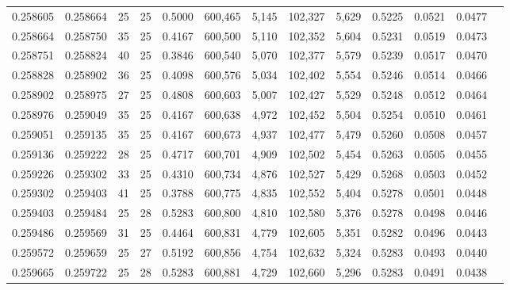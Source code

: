 \begin{tabular}{rrrrrrrrrrrrr}
0.258605 & 0.258664 &    25 &  25 &                                     0.5000 & 600,465 &   5,145 & 102,327 &   5,629 & 0.5225 & 0.0521 & 0.0477 \\
0.258664 & 0.258750 &    35 &  25 &                                     0.4167 & 600,500 &   5,110 & 102,352 &   5,604 & 0.5231 & 0.0519 & 0.0473 \\
0.258751 & 0.258824 &    40 &  25 &                                     0.3846 & 600,540 &   5,070 & 102,377 &   5,579 & 0.5239 & 0.0517 & 0.0470 \\
0.258828 & 0.258902 &    36 &  25 &                                     0.4098 & 600,576 &   5,034 & 102,402 &   5,554 & 0.5246 & 0.0514 & 0.0466 \\
0.258902 & 0.258975 &    27 &  25 &                                     0.4808 & 600,603 &   5,007 & 102,427 &   5,529 & 0.5248 & 0.0512 & 0.0464 \\
0.258976 & 0.259049 &    35 &  25 &                                     0.4167 & 600,638 &   4,972 & 102,452 &   5,504 & 0.5254 & 0.0510 & 0.0461 \\
0.259051 & 0.259135 &    35 &  25 &                                     0.4167 & 600,673 &   4,937 & 102,477 &   5,479 & 0.5260 & 0.0508 & 0.0457 \\
0.259136 & 0.259222 &    28 &  25 &                                     0.4717 & 600,701 &   4,909 & 102,502 &   5,454 & 0.5263 & 0.0505 & 0.0455 \\
0.259226 & 0.259302 &    33 &  25 &                                     0.4310 & 600,734 &   4,876 & 102,527 &   5,429 & 0.5268 & 0.0503 & 0.0452 \\
0.259302 & 0.259403 &    41 &  25 &                                     0.3788 & 600,775 &   4,835 & 102,552 &   5,404 & 0.5278 & 0.0501 & 0.0448 \\
0.259403 & 0.259484 &    25 &  28 &                                     0.5283 & 600,800 &   4,810 & 102,580 &   5,376 & 0.5278 & 0.0498 & 0.0446 \\
0.259486 & 0.259569 &    31 &  25 &                                     0.4464 & 600,831 &   4,779 & 102,605 &   5,351 & 0.5282 & 0.0496 & 0.0443 \\
0.259572 & 0.259659 &    25 &  27 &                                     0.5192 & 600,856 &   4,754 & 102,632 &   5,324 & 0.5283 & 0.0493 & 0.0440 \\
0.259665 & 0.259722 &    25 &  28 &                                     0.5283 & 600,881 &   4,729 & 102,660 &   5,296 & 0.5283 & 0.0491 & 0.0438 \\

\end{tabular}
